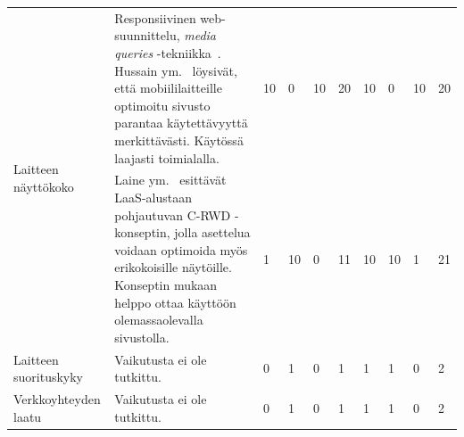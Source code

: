 \documentclass[finnish, 12pt, a4paper, elec, utf8, a-1b, online]{aaltothesis}
\begin{document}
{\begin{longtable}{p{2.5cm}|p{6cm}|p{0.5cm}p{0.5cm}p{0.5cm}|p{0.5cm}|p{0.5cm}p{0.5cm}p{0.5cm}|p{0.5cm}|}
    \midrule
    \multirow[t]{2}{*}{Laitteen näyttökoko} & Responsiivinen web-suunnittelu, \textit{media queries} -tekniikka~\cite{Rivoal:12:MQ}. Hussain ym.~\cite{WOS:000218608600006} löysivät, että mobiililaitteille optimoitu sivusto parantaa käytettävyyttä merkittävästi. Käytössä laajasti toimialalla.                                                                                                                  & 10                                         & 0                                   & 10                                     & 20                           & 10                                              & 0                                         & 10                                        & 20                           \\\cline{2-10}
                                            & Laine ym.~\cite{laine2021responsive} esittävät LaaS-alustaan pohjautuvan C-RWD -konseptin, jolla asettelua voidaan optimoida myös erikokoisille näytöille. Konseptin mukaan helppo ottaa käyttöön olemassaolevalla sivustolla.                                                                                                                                    & 1                                          & 10                                  & 0                                      & 11                           & 10                                              & 10                                        & 1                                         & 21                           \\
    \midrule
    Laitteen suorituskyky                   & Vaikutusta ei ole tutkittu.                                                                                                                                                                                                                                                                                                                                             & 0                                          & 1                                   & 0                                      & 1                            & 1                                               & 1                                         & 0                                         & 2                            \\
    \midrule
    Verkkoyhteyden laatu                    & Vaikutusta ei ole tutkittu.                                                                                                                                                                                                                                                                                                                                             & 0                                          & 1                                   & 0                                      & 1                            & 1                                               & 1                                         & 0                                         & 2                            \\

\end{longtable}}
\end{document}
